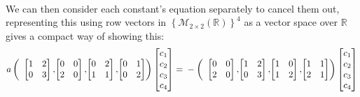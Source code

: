 \documentclass{article}
\begin{document}
\begin{solution}
\paragraph{}
We can then consider each constant's equation separately to cancel them out, representing this using row vectors in $\left\{\mathcal{M}_{2\times 2}\left( \mathbb{R} \right)\right\}^{4}$ as a vector space over $\mathbb{R}$ gives a compact way of showing this:
\[
a \left(
\begin{array}{c@{} c@{} c@{} c@{}}
\begin{bmatrix}
1	&	2	\\
0	&	3
\end{bmatrix},
&
\begin{bmatrix}
0	&	0	\\
2	&	0
\end{bmatrix},
&
\begin{bmatrix}
0	&	2	\\
1	&	1
\end{bmatrix},
&
\begin{bmatrix}
0	&	1	\\
0	&	2
\end{bmatrix}
\end{array}
\right)
\begin{bmatrix}
c_{1}	\\
c_{2}	\\
c_{3}	\\
c_{4}
\end{bmatrix}
=\\
-
\left(
\begin{array}{c@{} c@{} c@{} c@{}}
\begin{bmatrix}
0	&	0	\\
2	&	0
\end{bmatrix},
&
\begin{bmatrix}
1	&	2	\\
0	&	3
\end{bmatrix},
&
\begin{bmatrix}
1	&	0	\\
1	&	2
\end{bmatrix},
&
\begin{bmatrix}
1	&	1	\\
2	&	1
\end{bmatrix}
\end{array}
\right)
\begin{bmatrix}
c_{1}	\\
c_{2}	\\
c_{3}	\\
c_{4}
\end{bmatrix}
\]
\end{solution}
\end{document}
